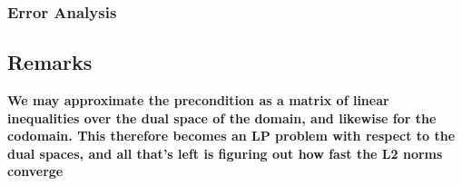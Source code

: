 \documentclass[12pt]{article}
\begin{document}
\subsubsection{Error Analysis}


\subsection{Remarks}


\textbf{We may approximate the precondition as a matrix of linear inequalities
over the dual space of the domain, and likewise for the codomain.
This therefore becomes an LP problem with respect to the dual spaces, and
all that's left is figuring out how fast the L2 norms converge}
\end{document}
